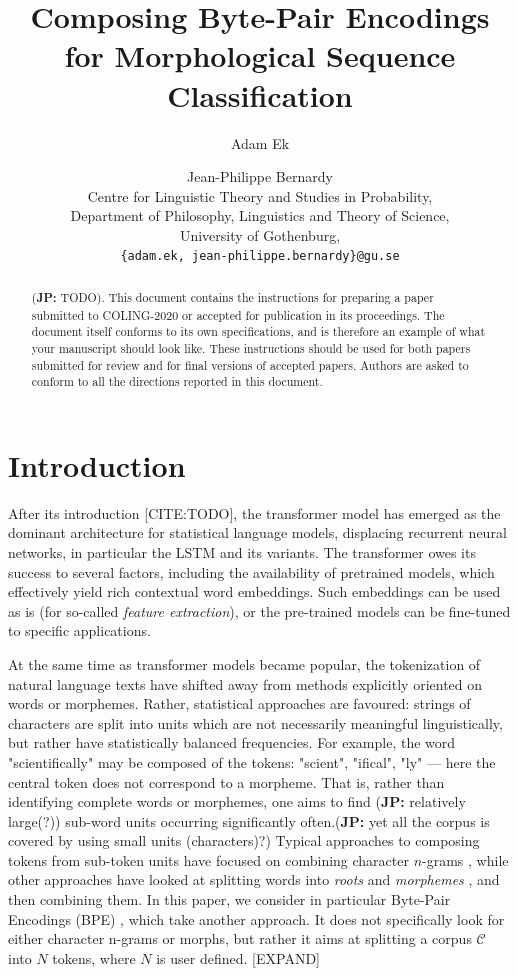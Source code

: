 \documentclass[11pt]{article}
\title{Composing Byte-Pair Encodings for Morphological Sequence Classification}
\author{Adam Ek \and Jean-Philippe Bernardy\\
	Centre for Linguistic Theory and Studies in Probability,\\
	Department of Philosophy, Linguistics and Theory of Science,\\
	University of Gothenburg,\\
	\texttt{\{adam.ek, jean-philippe.bernardy\}@gu.se}}
\date{}
\newcommand\jp[1]{(\textbf{JP:} #1)}
\newcommand\citep{\cite}
\begin{document}
	\maketitle
	
	\begin{abstract}
		\jp{TODO}. This document contains the instructions for preparing a paper submitted
		to COLING-2020 or accepted for publication in its proceedings. The document itself
		conforms to its own specifications, and is therefore an example of
		what your manuscript should look like. These instructions should be
		used for both papers submitted for review and for final versions of
		accepted papers. Authors are asked to conform to all the directions
		reported in this document.
	\end{abstract}
	
	\section{Introduction}
	\label{intro}

            After its introduction [CITE:TODO], the transformer model
     \citep{vaswani2017attention} has emerged as the dominant
     architecture for statistical language models, displacing
     recurrent neural networks, in particular the LSTM and its
     variants. The transformer owes its success to several factors,
     including the availability of pretrained models, which
     effectively yield rich contextual word embeddings. Such
     embeddings can be used as is (for so-called \emph{feature extraction}),
     or the pre-trained models can be fine-tuned to specific
     applications.

    	At the same time as transformer models became popular, the
     tokenization of natural language texts have shifted away from
     methods explicitly oriented on words or morphemes. Rather,
     statistical approaches are favoured: strings of
     characters are split into units which are not necessarily meaningful
     linguistically, but rather have statistically balanced
     frequencies. For example, the word "scientifically" may be
     composed of the tokens: "scient", "ifical", "ly" --- here the
     central token does not correspond to a morpheme.
    That is, rather than identifying complete words or morphemes, one
     aims to find \jp{relatively large(?)} sub-word units occurring significantly
     often.\jp{yet all the corpus is covered by using small units (characters)?} Typical approaches to composing tokens from sub-token
     units have focused on combining character $n$-grams
     \citep{bojanowski2017enriching}, while other approaches have
     looked at splitting words into \textit{roots} and
     \textit{morphemes}
     \citep{el2012orthographic,chaudhary2018adapting,xu2017implicitly},
     and then combining them. In this paper, we consider in particular
     Byte-Pair Encodings (BPE) \citep{sennrich2015neural}, which take
     another approach. It does not specifically look for either
     character n-grams or morphs, but rather it aims at splitting a
     corpus $\mathcal{C}$ into $N$ tokens, where $N$ is user
     defined. [EXPAND]
\end{document}
